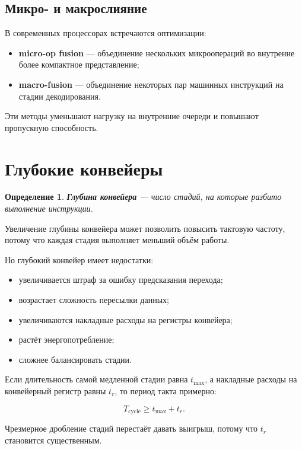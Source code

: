 \documentclass[12pt,a4paper]{article}
\newtheorem{definition}{Определение}
\begin{document}
\subsection{Микро- и макрослияние}

В современных процессорах встречаются оптимизации:

\begin{itemize}
    \item \textbf{micro-op fusion} --- объединение нескольких микроопераций во внутренне более компактное представление;
    \item \textbf{macro-fusion} --- объединение некоторых пар машинных инструкций на стадии декодирования.
\end{itemize}

Эти методы уменьшают нагрузку на внутренние очереди и повышают пропускную способность.

\section{Глубокие конвейеры}

\begin{definition}
\textbf{Глубина конвейера} --- число стадий, на которые разбито выполнение инструкции.
\end{definition}

Увеличение глубины конвейера может позволить повысить тактовую частоту, потому что каждая стадия выполняет меньший объём работы.

Но глубокий конвейер имеет недостатки:

\begin{itemize}
    \item увеличивается штраф за ошибку предсказания перехода;
    \item возрастает сложность пересылки данных;
    \item увеличиваются накладные расходы на регистры конвейера;
    \item растёт энергопотребление;
    \item сложнее балансировать стадии.
\end{itemize}

Если длительность самой медленной стадии равна $t_{\max}$, а накладные расходы на конвейерный регистр равны $t_r$, то период такта примерно:

\[
    T_{\text{cycle}} \geq t_{\max} + t_r.
\]

Чрезмерное дробление стадий перестаёт давать выигрыш, потому что $t_r$ становится существенным.
\end{document}
